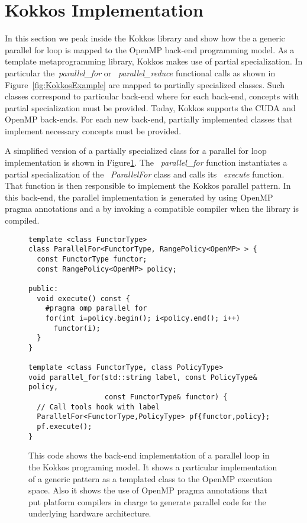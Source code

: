 
\section{Kokkos Implementation}\label{chap:backend}

In this section we peak inside the Kokkos library and show how the a generic parallel for loop is mapped to the OpenMP back-end programming model. As a template metaprogramming library, Kokkos makes use of partial specialization. In particular the~\emph{parallel\_for} or ~\emph{parallel\_reduce} functional calls as shown in Figure~\ref{fig:KokkosExample} are mapped to partially specialized classes. Such classes correspond to particular back-end where for each back-end, concepts with partial specialization must be provided. Today, Kokkos supports the CUDA and OpenMP back-ends. For each new back-end, partially implemented classes that implement necessary concepts must be provided.

A simplified version of a partially specialized class for a parallel for loop implementation is shown in Figure\ref{fig:KokkosExampleOMPBackEnd}. The ~\emph{parallel\_for} function instantiates a partial specialization of the ~\emph{ParallelFor} class and calls its ~\emph{execute} function. That function is then responsible to implement the Kokkos parallel pattern. In this back-end, the parallel implementation is generated by using OpenMP pragma annotations and a by invoking a compatible compiler when the library is compiled. 
\begin{figure}
\begin{small}
\begin{Verbatim}[frame=leftline]
template <class FunctorType>
class ParallelFor<FunctorType, RangePolicy<OpenMP> > {
  const FunctorType functor;
  const RangePolicy<OpenMP> policy; 

public:
  void execute() const {
    #pragma omp parallel for
    for(int i=policy.begin(); i<policy.end(); i++)
      functor(i);
  }
}

template <class FunctorType, class PolicyType>
void parallel_for(std::string label, const PolicyType& policy,
                  const FunctorType& functor) {
  // Call tools hook with label
  ParallelFor<FunctorType,PolicyType> pf{functor,policy};
  pf.execute();
}

\end{Verbatim}
\end{small}
\caption{This code shows the back-end implementation of a parallel loop in the Kokkos programing model. It shows a particular implementation of a generic pattern as a templated class to the OpenMP execution space. Also it shows the use of OpenMP pragma annotations that put platform compilers in charge to generate parallel code for the underlying hardware architecture.}
\label{fig:KokkosExampleOMPBackEnd}
\end{figure}


